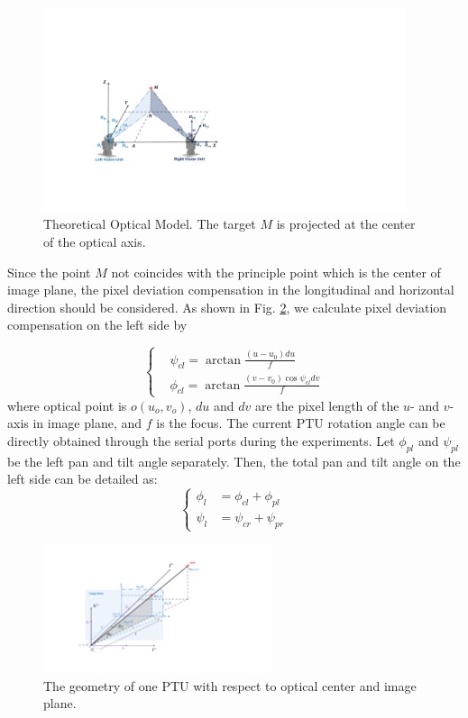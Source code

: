 \begin{figure}[!tb]
	\centering
	\includegraphics[height=6cm]{figs/Fig03_Stereo.pdf}	
	\caption{Theoretical Optical Model. The target $M$ is projected at the center of the optical axis.}
	\label{fig:TheoreticalModel}
\end{figure}


Since the point ${M}$ not coincides with the principle point which is the center of image plane, the pixel deviation compensation in the longitudinal and horizontal direction should be considered. As shown in Fig. \ref{fig:Fig02_ImagePlaneOnly}, we calculate pixel deviation compensation on the left side by 

\begin{equation} 
\left \{
	\begin{split}
		& \psi_{cl} = \arctan \frac{(u-u_0)du}{f} \\
		& \phi_{cl} = \arctan \frac{(v-v_0)\cos\psi_{cl}dv}{f} 
	\end{split}
\right.
\end{equation}
where optical point is $o(u_o,v_o)$, $du$ and $dv$ are the pixel length of the $u$- and $v$-axis in image plane, and $f$ is the focus. The current PTU rotation angle can be directly obtained through the serial ports during the experiments. Let $\phi_{pl}$ and $\psi_{pl}$ be the left pan and tilt angle separately. Then, the total pan and tilt angle on the left side can be detailed as:
\begin{equation} 
\left \{
	\begin{split}
	    \phi_l &= \phi_{cl} + \phi_{pl} \\ 
	    \psi_l &= \psi_{cr} + \psi_{pr}
	\end{split}
\right.
\end{equation}

\begin{figure}[!th]
	\centering
	\includegraphics[width=0.6\textwidth]{Figs/chp03_vision_02_image_plane.pdf}
	\caption{The geometry of one PTU with respect to optical center and image plane.}
	\label{fig:Fig02_ImagePlaneOnly}
\end{figure}

